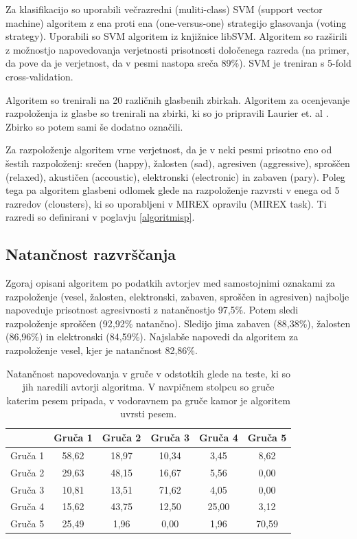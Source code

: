 \documentclass[a4paper, 12pt]{book}
\begin{document}
{Za klasifikacijo so uporabili večrazredni (muliti-class) SVM (support vector machine) algoritem z ena proti ena (one-versus-one) strategijo glasovanja (voting strategy). Uporabili so SVM algoritem iz knjižnice libSVM. Algoritem so razširili z možnostjo napovedovanja verjetnosti prisotnosti določenega razreda (na primer, da pove da je verjetnost, da v pesmi nastopa sreča 89\%). SVM je treniran s 5-fold cross-validation.  

Algoritem so trenirali na 20 različnih glasbenih zbirkah. Algoritem za ocenjevanje razpoloženja iz glasbe so trenirali na zbirki, ki so jo pripravili Laurier et. al \cite{Laurier2009}. Zbirko so potem sami še dodatno označili. 

Za razpoloženje algoritem vrne verjetnost, da je v neki pesmi prisotno eno od šestih razpoloženj: srečen (happy), žalosten (sad), agresiven (aggressive), sproščen (relaxed), akustičen (accoustic), elektronski (electronic) in zabaven (pary). Poleg tega pa algoritem glasbeni odlomek glede na razpoloženje razvrsti v enega od 5 razredov (clousters), ki so uporabljeni v MIREX opravilu (MIREX task). Ti razredi so definirani v poglavju \ref{algoritmisp}.

\subsection{Natančnost razvrščanja}
\label{natancnostessentia}

Zgoraj opisani algoritem po podatkih avtorjev med samostojnimi oznakami za razpoloženje (vesel, žalosten, elektronski, zabaven, sproščen in agresiven) najbolje napoveduje prisotnost agresivnosti z natančnostjo 97,5\%. Potem sledi razpoloženje sproščen (92,92\% natančno). Sledijo jima zabaven (88,38\%), žalosten (86,96\%) in elektronski (84,59\%). Najslabše napovedi da algoritem za razpoloženje vesel, kjer je natančnost 82,86\%.

\begin{table}[htb]
\begin{center}
\caption{Natančnost napovedovanja v gruče v odstotkih glede na teste, ki so jih naredili avtorji algoritma. V navpičnem stolpcu so gruče katerim pesem pripada, v vodoravnem pa gruče kamor je algoritem uvrsti pesem.}
\begin{tabular}{|l|c|c|c|c|c|}
\hline
 & Gruča 1 & Gruča 2 & Gruča 3 & Gruča 4 & Gruča 5 \\ \hline
Gruča 1 & 58,62 & 18,97	& 10,34 & 3,45 & 8,62 \\ \hline
Gruča 2 & 29,63 & 48,15 & 16,67 & 5,56 & 0,00 \\ \hline
Gruča 3 & 10,81 & 13,51 & 71,62 & 4,05 & 0,00 \\ \hline
Gruča 4 & 15,62	& 43,75	& 12,50	& 25,00	& 3,12 \\ \hline
Gruča 5 & 25,49	& 1,96	& 0,00 & 1,96 & 70,59 \\ \hline


\end{tabular}
\end{center}
\end{table}}
\end{document}
